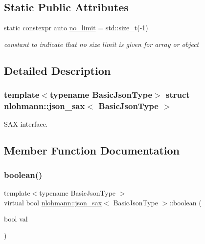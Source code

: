 \subsection*{Static Public Attributes}
\begin{DoxyCompactItemize}
\item 
\mbox{\label{structnlohmann_1_1json__sax_a84031c6bbd5b85ec13da024fe9e2b9c9}} 
static constexpr auto \mbox{\hyperlink{structnlohmann_1_1json__sax_a84031c6bbd5b85ec13da024fe9e2b9c9}{no\+\_\+limit}} = std\+::size\+\_\+t(-\/1)
\begin{DoxyCompactList}\small\item\em constant to indicate that no size limit is given for array or object \end{DoxyCompactList}\end{DoxyCompactItemize}


\subsection{Detailed Description}
\subsubsection*{template$<$typename Basic\+Json\+Type$>$\newline
struct nlohmann\+::json\+\_\+sax$<$ Basic\+Json\+Type $>$}

S\+AX interface. 

\subsection{Member Function Documentation}
\mbox{\label{structnlohmann_1_1json__sax_a82ed080814fa656191a537284bb0c575}} 
\subsubsection{\texorpdfstring{boolean()}{boolean()}}
{\footnotesize\ttfamily template$<$typename Basic\+Json\+Type $>$ \\
virtual bool \mbox{\hyperlink{structnlohmann_1_1json__sax}{nlohmann\+::json\+\_\+sax}}$<$ Basic\+Json\+Type $>$\+::boolean (\begin{DoxyParamCaption}\item[{bool}]{val }\end{DoxyParamCaption})\hspace{0.3cm}{\ttfamily [pure virtual]}}



